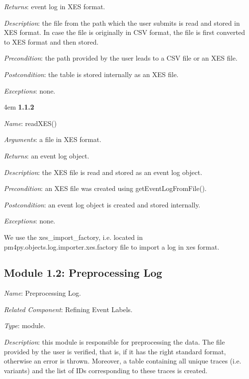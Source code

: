 \documentclass[notitlepage]{article}
\begin{document}
\begin{flushleft}
\textit{Returns}: event log in XES format.

\textit{Description}: the file from the path which the user submits is read and stored in XES format. In case the file is originally in CSV format, the file is first converted to XES format and then stored.

\textit{Precondition}: the path provided by the user leads to a CSV file or an XES file.

\textit{Postcondition}: the table is stored internally as an XES file.

\textit{Exceptions}: none.
\par
\endgroup

\medskip

\par
\begingroup
\leftskip4em
\textbf{1.1.2}

\textit{Name}: readXES()

\textit{Arguments}: a file in XES format.

\textit{Returns}: an event log object.

\textit{Description}: the XES file is read and stored as an event log object.

\textit{Precondition}: an XES file was created using getEventLogFromFile().

\textit{Postcondition}: an event log object is created and stored internally.

\textit{Exceptions}: none.
\par
\endgroup

\medskip

We use the xes\_import\_factory, i.e. located in pm4py.objects.log.importer.xes.factory file to import a log in xes format.
\medskip

\subsection{Module 1.2: Preprocessing Log}
\textit{Name}: Preprocessing Log.

\textit{Related Component}: Refining Event Labels.

\textit{Type}: module.

\textit{Description}: this module is responsible for preprocessing the data. The file provided by the user is verified, that is, if it has the right standard format, otherwise an error is thrown. Moreover, a table containing all unique traces (i.e. variants) and the list of IDs corresponding to these traces is created.


\end{flushleft}
\end{document}
